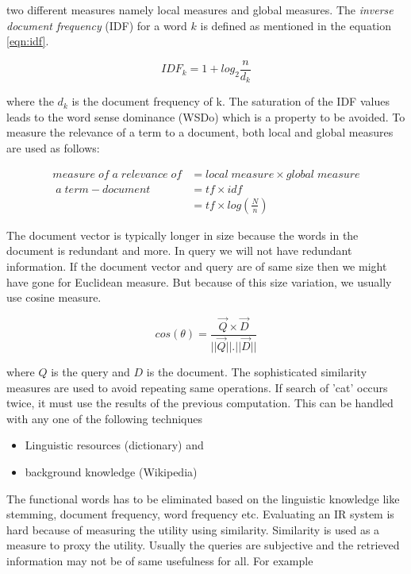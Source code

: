 \documentclass{bmcart}
\begin{document}
two different measures namely local measures and global measures. The {\it inverse document frequency} (IDF) for a word $k$ is defined as mentioned in the equation \ref{eqn:idf}.
\begin{center}
\begin{equation}
IDF_k=1+log_2\frac{n}{d_k}
\end{equation}
\label{eqn:idf}
\end{center}
where the $d_k$ is the document frequency of k. The saturation of the IDF values leads to the word sense dominance (WSDo) which is a property to be avoided. To measure the relevance of a term to a document, both local and global measures are used as follows:
\begin{center}
\begin{align*}
measure\;of\;a\;relevance\;of&= local\;measure \times global\;measure \\
											\;a\;term-document &= tf \times idf \\
																	  &= tf \times log \left( \frac{N}{n}\right)
\end{align*}
\label{eqn:termDocMeasure}
\end{center}
The document vector is typically longer in size because the words in the document is redundant and more. In query we will not have redundant information. If the document vector and query are of same size then we might have gone for Euclidean measure. But because of this size variation, we usually use cosine measure.
\begin{center}
\begin{equation}
cos(\theta)=\frac{\vec{Q} \times \vec{D}}{||\vec{Q}||.||\vec{D}||}
\end{equation}
\end{center}
where $Q$ is the query and $D$ is the document. The sophisticated similarity measures are used to avoid repeating same operations. If search of 'cat' occurs twice, it must use the results of the previous computation. This can be handled with any one of the following techniques
\begin{itemize}
\item Linguistic resources (dictionary) and
\item background knowledge (Wikipedia)
\end{itemize}
The functional words has to be eliminated based on the linguistic knowledge like stemming, document frequency, word frequency etc. Evaluating an IR system is hard because of measuring the utility using similarity. Similarity is used as a measure to proxy the utility. Usually the queries are subjective and the retrieved information may not be of same usefulness for all. For example
\end{document}

